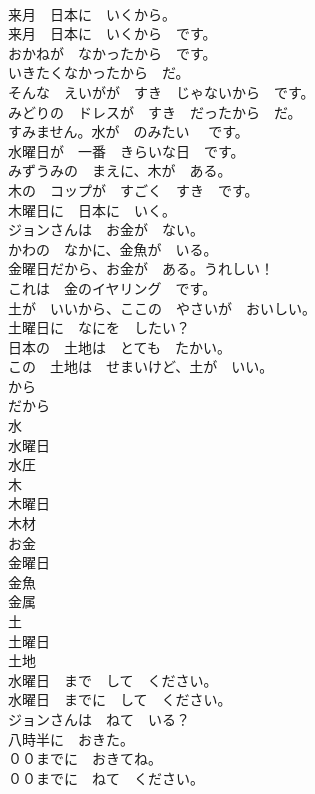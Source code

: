 \documentclass[8pt]{extreport}
\begin{document}
\begin{CJK}{UTF8}{min}
\\	来月　日本に　いくから。	
\\	来月　日本に　いくから　です。	
\\	おかねが　なかったから　です。	
\\	いきたくなかったから　だ。	
\\	そんな　えいがが　すき　じゃないから　です。	
\\	みどりの　ドレスが　すき　だったから　だ。	
\\	すみません。水が　のみたい 　です。	
\\	水曜日が　一番　きらいな日　です。	
\\	みずうみの　まえに、木が　ある。	
\\	木の　コップが　すごく　すき　です。	
\\	木曜日に　日本に　いく。	
\\	ジョンさんは　お金が　ない。	
\\	かわの　なかに、金魚が　いる。	
\\	金曜日だから、お金が　ある。うれしい！	
\\	これは　金のイヤリング　です。	
\\	土が　いいから、ここの　やさいが　おいしい。	
\\	土曜日に　なにを　したい？	
\\	日本の　土地は　とても　たかい。	
\\	この　土地は　せまいけど、土が　いい。	
\\	から	
\\	だから	
\\	水	
\\	水曜日	
\\	水圧	
\\	木	
\\	木曜日	
\\	木材	
\\	お金	
\\	金曜日	
\\	金魚	
\\	金属	
\\	土	
\\	土曜日	
\\	土地	
\\	水曜日　まで　して　ください。	
\\	水曜日　までに　して　ください。	
\\	ジョンさんは　ねて　いる？	
\\	八時半に　おきた。	
\\	００までに　おきてね。	
\\	００までに　ねて　ください。	

\end{CJK}
\end{document}
